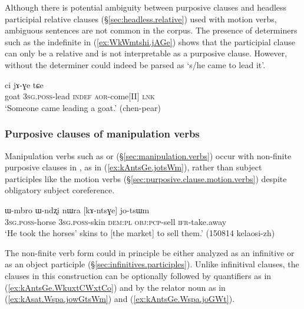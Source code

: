 Although there is potential ambiguity between purposive clauses and headless participial relative clauses (§\ref{sec:headless.relative}) used with motion verbs, ambiguous sentences are not common in the corpus. The presence of determiners such as the indefinite  in (\ref{ex:WkWmtshi.jAGe}) shows that the participial clause can only be a relative and is not interpretable as a purposive clause. However,  without the determiner could indeed be parsed as `s/he came to lead it'.

\begin{exe}
	\ex \label{ex:WkWmtshi.jAGe}
	 ci jɤ-ɣe tɕe \\
	goat \textsc{3sg}.\textsc{poss}-lead \textsc{indef} \textsc{aor}-come[II] \textsc{lnk} \\
	\glt `Someone came leading a goat.' (chen-pear)
\end{exe}

\subsubsection{Purposive clauses of manipulation verbs} \label{sec:participial.clause.essive}
Manipulation verbs such as  or  (§\ref{sec:manipulation.verbs}) occur with non-finite purposive clauses in , as in (\ref{ex:kAntsGe.jotsWm}), rather than subject participles like the motion verbs (§\ref{sec:purposive.clause.motion.verbs}) despite obligatory subject coreference.

\begin{exe}
	\ex \label{ex:kAntsGe.jotsWm}
	\gll ɯ-mbro ɯ-ndʐi nɯra [kɤ-ntsɣe] jo-tsɯm \\
	\textsc{3sg}.\textsc{poss}-horse \textsc{3sg}.\textsc{poss}-skin \textsc{dem}:\textsc{pl} \textsc{obj}:\textsc{pcp}-sell \textsc{ifr}-take.away \\
	\glt `He took the horses' skins to [the market] to sell them.' (150814 kelaosi-zh)
\end{exe}

The non-finite verb form  could in principle be either analyzed as an infinitive or as an object participle (§\ref{sec:infinitives.participles}). Unlike infinitival clauses, the  clauses in this construction can be optionally followed by quantifiers as in (\ref{ex:kAntsGe.WkuxtCWxtCo}) and by the relator noun  as in (\ref{ex:kAsat.Wspa.jowGtsWm}) and (\ref{ex:kAntsGe.Wspa.joGWt}). 

